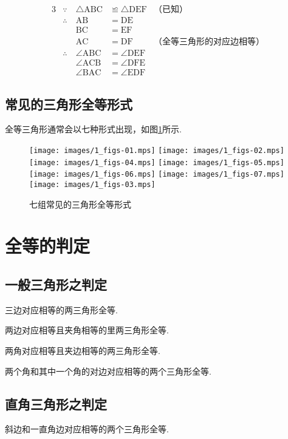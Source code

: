 \documentclass[oneside]{ctexbook}
\begin{document}
\begin{alignat*}{3}
    &\because   \ &\triangle \mathrm{ABC} &\backcong \triangle \mathrm{DEF} &\mbox{（已知）}   \\
    &\therefore \ &          \mathrm{AB}  &=\mathrm{DE}                                               \\
    &           \ &          \mathrm{BC}  &=\mathrm{EF}                                               \\
    &           \ &          \mathrm{AC}  &=\mathrm{DF} &\mbox{（全等三角形的对应边相等）} \\
    &\therefore \ &\angle \mathrm{ABC}    &= \angle \mathrm{DEF} \\
    &           \ &\angle \mathrm{ACB}    &= \angle \mathrm{DFE} \\
    &           \ &\angle \mathrm{BAC}    &= \angle \mathrm{EDF}
\end{alignat*}

\subsection{常见的三角形全等形式}

全等三角形通常会以七种形式出现，如图\ref{p2}所示.

\begin{figure}[htbp]
\centering
\texttt{[image: images/1\_figs-01.mps]}
\texttt{[image: images/1\_figs-02.mps]}
\texttt{[image: images/1\_figs-04.mps]}
\texttt{[image: images/1\_figs-05.mps]}
\texttt{[image: images/1\_figs-06.mps]}
\texttt{[image: images/1\_figs-07.mps]}
\texttt{[image: images/1\_figs-03.mps]}
\caption{七组常见的三角形全等形式}
\label{p2}
\end{figure}

\newpage

\section{全等的判定}

\subsection{一般三角形之判定}
\begin{theorem}[SSS]
    三边对应相等的两三角形全等.
\end{theorem}

\begin{theorem}[SAS]
    两边对应相等且夹角相等的里两三角形全等.
\end{theorem}

\begin{theorem}[ASA]
    两角对应相等且夹边相等的两三角形全等.
\end{theorem}

\begin{theorem}[AAS]
    两个角和其中一个角的对边对应相等的两个三角形全等.
\end{theorem}

\subsection{直角三角形之判定}
\begin{theorem}[HL]
    斜边和一直角边对应相等的两个三角形全等.
\end{theorem}
\end{document}
